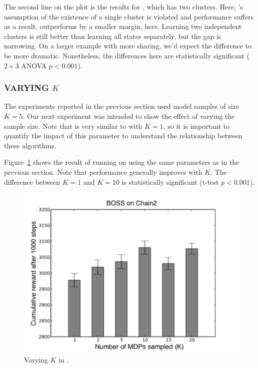 The second line on the plot is the results for , which has two
clusters.  Here, 's assumption of the existence of a single
cluster is violated and performance suffers as a result.  
outperforms  by a smaller margin, here.  Learning two independent
clusters is still better than learning all states separately, but the
gap is narrowing.  On a larger example with more sharing, we'd expect
the difference to be more dramatic.  Nonetheless, the differences here
are statistically significant ($2\times 3$ ANOVA $p<0.001$).


\subsubsection{VARYING $K$}

The experiments reported in the previous section used model samples of
size $K=5$.  Our next experiment was intended to show the effect of varying the
sample size.  Note that  is very similar to  with $K=1$,
so it is important to quantify the impact of this parameter to
understand the relationship between these algorithms.

Figure~\ref{f:varyk} shows the result of running  on  using
the same parameters as in the previous section.  Note that performance
generally improves with $K$.  The difference between $K=1$ and $K=10$ is
statistically significant (t-test $p<0.001$).

\begin{figure}[t]
\begin{center}
\includegraphics[width=1.0\linewidth]{varyk}
\caption{Varying $K$ in .}
\label{f:varyk}
\end{center}
\end{figure}


